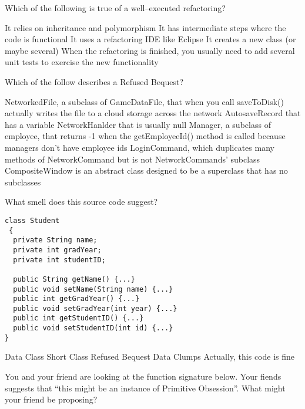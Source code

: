 \documentclass{exam}
\begin{document}
\begin{questions}
\question[1]

Which of the following is true of a well--executed refactoring?

\begin{choices}
\choice It relies on inheritance and polymorphism
\choice It has intermediate steps where the code is functional
\choice It uses a refactoring IDE like Eclipse
\choice It creates a new class (or maybe several)
\choice When the refactoring is finished, you usually need to add several unit tests to exercise the new functionality
\end{choices}

\question[1]
Which of the follow describes a Refused Bequest?

\begin{choices}
\choice NetworkedFile, a subclass of GameDataFile, that when you call saveToDisk() actually writes the file to a cloud storage across the network
\choice AutosaveRecord that has a variable NetworkHanlder that is usually null
\choice Manager, a subclass of employee, that returns -1 when the getEmployeeId() method is called because managers don't have employee ids
\choice LoginCommand, which duplicates many methods of NetworkCommand but is not NetworkCommands' subclass
\choice CompositeWindow is an abstract class designed to be a superclass that has no subclasses
\end{choices}

\question[1] What smell does this source code suggest?

\begin{lstlisting}
class Student
 {
  private String name;
  private int gradYear;
  private int studentID;

  public String getName() {...}
  public void setName(String name) {...}
  public int getGradYear() {...}
  public void setGradYear(int year) {...}
  public int getStudentID() {...}
  public void setStudentID(int id) {...}
}
\end{lstlisting}

\begin{choices}
\choice Data Class
\choice Short Class
\choice Refused Bequest
\choice Data Clumps
\choice Actually, this code is fine
\end{choices}

\question[1]

You and your friend are looking at the function signature below.  Your fiends suggests that ``this might be an instance of Primitive Obsession''.  What might your friend be proposing?


\end{questions}
\end{document}
